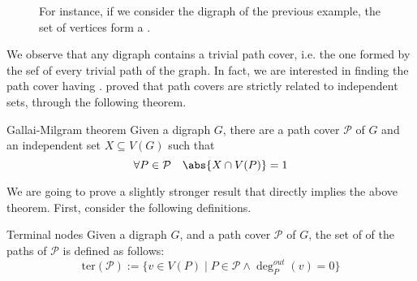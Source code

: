 \documentclass[a4paper, 12pt]{report}
\begin{document}
    \begin{figure}[H]
        \centering
        \caption{For instance, if we consider the digraph of the previous example, the set of  vertices form a .}
        \label{path cover}
    \end{figure}

    We observe that any digraph contains a trivial path cover, i.e. the one formed by the sef of every trivial path of the graph. In fact, we are interested in finding the path cover having . \textcite{gallai} proved that path covers are strictly related to independent sets, through the following theorem.

    \begin{framedthm}{Gallai-Milgram theorem}
        Given a digraph $G$, there are a path cover $\mathcal P$ of $G$ and an independent set $X \subseteq V(G)$ such that $$\forall P \in \mathcal P \quad \abs{X \cap V(P)} = 1$$
    \end{framedthm}

    We are going to prove a slightly stronger result that directly implies the above theorem. First, consider the following definitions.

    \begin{frameddefn}{Terminal nodes}
        Given a digraph $G$, and a path cover $\mathcal P$ of $G$, the set of  of the paths of $\mathcal P$ is defined as follows: $$\mathrm{ter}(\mathcal P) := \{v \in V(P) \mid P \in \mathcal P \land \deg_P^{out}(v) = 0\}$$
    \end{frameddefn}
\end{document}
